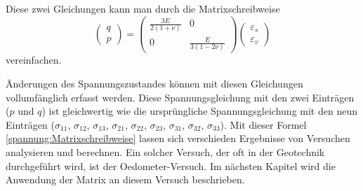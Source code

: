 Diese zwei Gleichungen kann man durch die Matrixschreibweise
\begin{equation}
\begin{pmatrix}
	q\\
	p
\end{pmatrix}
=
\begin{pmatrix}
	\displaystyle{\frac{3E}{2(1+\nu)}} &                                  0 \\
	                                 0 & \displaystyle{\frac{E}{3(1-2\nu)}}
\end{pmatrix}
\begin{pmatrix}
	\varepsilon_{s}\\
	\varepsilon_{v}
\end{pmatrix}
\label{spannung:Matrixschreibweise}
\end{equation}
vereinfachen.

Änderungen des Spannungszustandes können mit diesen Gleichungen vollumfänglich erfasst werden.
Diese Spannungsgleichung mit den zwei Einträgen ($p$ und $q$) ist gleichwertig
wie die ursprüngliche Spannungsgleichung mit den neun Einträgen
($\sigma_{11}$, $\sigma_{12}$, $\sigma_{13}$, $\sigma_{21}$, $\sigma_{22}$, $\sigma_{23}$, $\sigma_{31}$, $\sigma_{32}$, $\sigma_{33}$).
Mit dieser Formel \eqref{spannung:Matrixschreibweise} lassen sich verschieden Ergebnisse von Versuchen analysieren und berechnen.
Ein solcher Versuch, der oft in der Geotechnik durchgeführt wird, ist der Oedometer-Versuch.
Im nächsten Kapitel wird die Anwendung der Matrix an diesem Versuch beschrieben.

